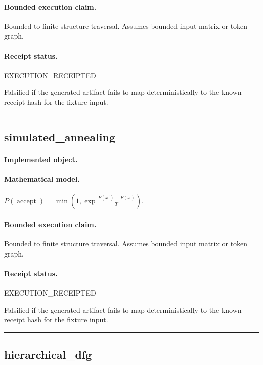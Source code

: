 \paragraph{Bounded execution claim.} Bounded to finite structure traversal. Assumes bounded input matrix or token graph.
\paragraph{Receipt status.} EXECUTION\_RECEIPTED
\begin{falsifier}
Falsified if the generated artifact fails to map deterministically to the known receipt hash for the fixture input.
\end{falsifier}

\vspace{1em}\hrule\vspace{1em}
\subsection{simulated\_annealing}
\paragraph{Implemented object.} 
\paragraph{Mathematical model.} $P(\operatorname{accept}) = \min\left(1,\exp\frac{F(x')-F(x)}{T}\right).$
\paragraph{Bounded execution claim.} Bounded to finite structure traversal. Assumes bounded input matrix or token graph.
\paragraph{Receipt status.} EXECUTION\_RECEIPTED
\begin{falsifier}
Falsified if the generated artifact fails to map deterministically to the known receipt hash for the fixture input.
\end{falsifier}

\vspace{1em}\hrule\vspace{1em}
\subsection{hierarchical\_dfg}
